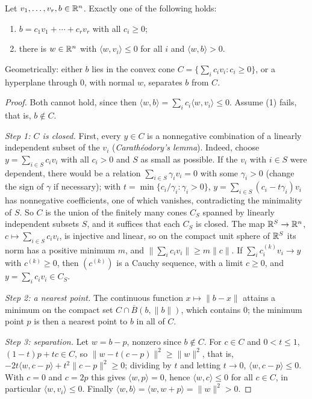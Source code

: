\begin{lemma}[Farkas]\label{real-analysis:lemma-farkas}
Let $v_1, \ldots, v_r, b \in \mathbb{R}^n$. Exactly one of the following holds:
\begin{enumerate}
\item $b = c_1v_1 + \cdots + c_rv_r$ with all $c_i \geq 0$;
\item there is $w \in \mathbb{R}^n$ with $\langle w, v_i\rangle \leq 0$ for all $i$ and $\langle w, b\rangle > 0$.
\end{enumerate}
\end{lemma}

Geometrically: either $b$ lies in the convex cone $C = \{\sum_ic_iv_i : c_i \geq 0\}$, or a hyperplane through $0$, with normal $w$, separates $b$ from $C$.

\begin{proof}
Both cannot hold, since then $\langle w, b\rangle = \sum_ic_i\langle w, v_i\rangle \leq 0$. Assume (1) fails, that is, $b \notin C$.

\emph{Step 1: $C$ is closed.} First, every $y \in C$ is a nonnegative combination of a linearly independent subset of the $v_i$ (\emph{Carath\'eodory's lemma}). Indeed, choose
$y = \sum_{i \in S}c_iv_i$ with all $c_i > 0$ and $S$ as small as possible. If the $v_i$ with $i \in S$ were dependent, there would be a relation $\sum_{i \in S}\gamma_iv_i = 0$ with some $\gamma_i > 0$
(change the sign of $\gamma$ if necessary); with $t = \min\{c_i/\gamma_i : \gamma_i > 0\}$, $y = \sum_{i \in S}(c_i - t\gamma_i)v_i$ has nonnegative coefficients, one of which vanishes, contradicting the
minimality of $S$. So $C$ is the union of the finitely many cones $C_S$ spanned by linearly independent subsets $S$, and it suffices that each $C_S$ is closed. The map $\mathbb{R}^S \to \mathbb{R}^n$,
$c \mapsto \sum_{i \in S}c_iv_i$, is injective and linear, so on the compact unit sphere of $\mathbb{R}^S$ its norm has a positive minimum $m$, and $\|\sum_ic_iv_i\| \geq m\|c\|$. If
$\sum_ic_i^{(k)}v_i \to y$ with $c^{(k)} \geq 0$, then $(c^{(k)})$ is a Cauchy sequence, with a limit $c \geq 0$, and $y = \sum_ic_iv_i \in C_S$.

\emph{Step 2: a nearest point.} The continuous function $x \mapsto \|b - x\|$ attains a minimum on the compact set $C \cap \overline{B}(b, \|b\|)$, which contains $0$; the minimum point $p$ is then a
nearest point to $b$ in all of $C$.

\emph{Step 3: separation.} Let $w = b - p$, nonzero since $b \notin C$. For $c \in C$ and $0 < t \leq 1$, $(1 - t)p + tc \in C$, so
$\|w - t(c - p)\|^2 \geq \|w\|^2$, that is, $-2t\langle w, c - p\rangle + t^2\|c - p\|^2 \geq 0$; dividing by $t$ and letting $t \to 0$, $\langle w, c - p\rangle \leq 0$. With $c = 0$ and $c = 2p$ this gives
$\langle w, p\rangle = 0$, hence $\langle w, c\rangle \leq 0$ for all $c \in C$, in particular $\langle w, v_i\rangle \leq 0$. Finally $\langle w, b\rangle = \langle w, w + p\rangle = \|w\|^2 > 0$.
\end{proof}

